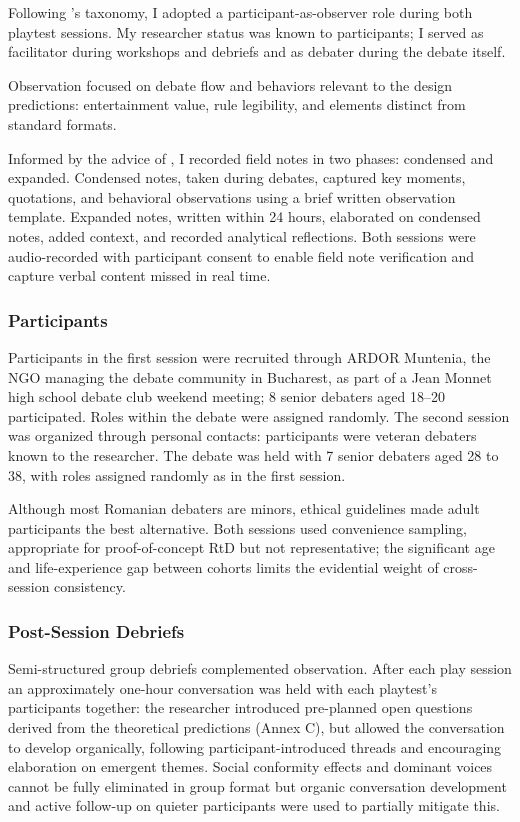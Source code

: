 Following \textcite{baker2006observation}'s taxonomy, I adopted a participant-as-observer role during both playtest sessions. My researcher status was known to participants; I served as facilitator during workshops and debriefs and as debater during the debate itself.

Observation focused on debate flow and behaviors relevant to the design predictions: entertainment value, rule legibility, and elements distinct from standard formats.

Informed by the advice of \textcite{spradley1980participant}, I recorded field notes in two phases: condensed and expanded. Condensed notes, taken during debates, captured key moments, quotations, and behavioral observations using a brief written observation template. Expanded notes, written within 24 hours, elaborated on condensed notes, added context, and recorded analytical reflections. Both sessions were audio-recorded with participant consent to enable field note verification and capture verbal content missed in real time.

\subsubsection{Participants}

Participants in the first session were recruited through ARDOR Muntenia, the NGO managing the debate community in Bucharest, as part of a Jean Monnet high school debate club weekend meeting; 8 senior debaters aged 18--20 participated. Roles within the debate were assigned randomly. The second session was organized through personal contacts: participants were veteran debaters known to the researcher. The debate was held with 7 senior debaters aged 28 to 38, with roles assigned randomly as in the first session.

Although most Romanian debaters are minors, ethical guidelines made adult participants the best alternative. Both sessions used convenience sampling, appropriate for proof-of-concept RtD but not representative; the significant age and life-experience gap between cohorts limits the evidential weight of cross-session consistency.

\subsubsection{Post-Session Debriefs}

Semi-structured group debriefs complemented observation. After each play session an approximately one-hour conversation was held with each playtest's participants together: the researcher introduced pre-planned open questions derived from the theoretical predictions (Annex C), but allowed the conversation to develop organically, following participant-introduced threads and encouraging elaboration on emergent themes. Social conformity effects and dominant voices cannot be fully eliminated in group format but organic conversation development and active follow-up on quieter participants were used to partially mitigate this.

